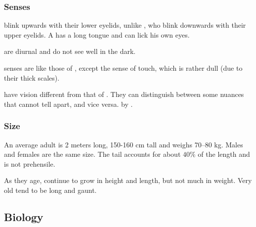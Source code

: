 \subsubsection{Senses}

\Scathae{} blink upwards with their lower eyelids, unlike \humans, who blink downwards with their upper eyelids. 
A \scatha{} has a long tongue and can lick his own eyes. 

\Scathae{} are diurnal and do not see well in the dark. 

\Scathaese{} senses are like those of \humans, except the sense of touch, which is rather dull (due to their thick scales). 

\Scathae{} have \colour vision different from that of \humans. They can distinguish between some nuances that \humans{} cannot tell apart, and vice versa.  by .





\subsubsection{Size}
An average adult \scatha{} is 2 meters long, 150-160 cm tall and weighs 70--80 kg. 
Males and females are the same size. 
The tail accounts for about $40\%$ of the length and is not prehensile. 

As they age, \scathae{} continue to grow in height and length, but not much in weight. Very old \scathae{} tend to be long and gaunt. 









\subsection{Biology}

